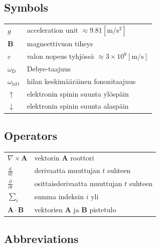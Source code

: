 \documentclass[english,12pt,a4paper,pdftex,elec,utf8]{aaltothesis}
\begin{document}


\subsection*{Symbols}

\begin{tabular}{ll}
$g$          & acceleration unit $ \approx 9.81 \mathrm{[m/s^2]}$\\
$\mathbf{B}$  & magneettivuon tiheys  \\
$c$              & valon nopeus tyhjössä $\approx 3\times10^8 \mathrm{ [m/s]}$\\
$\omega_{\mathrm{D}}$    & Debye-taajuus \\
$\omega_{\mathrm{latt}}$ & hilan keskimääräinen fononitaajuus \\
$\uparrow$       & elektronin spinin suunta ylöspäin\\
$\downarrow$     & elektronin spinin suunta alaspäin
\end{tabular}

\subsection*{Operators}

\begin{tabular}{ll}
$\nabla \times \mathbf{A}$              & vektorin $\mathbf{A}$ roottori\\
$\displaystyle\frac{\mbox{d}}{\mbox{d} t}$ & derivaatta muuttujan $t$ suhteen\\
[3mm]
$\displaystyle\frac{\partial}{\partial t}$  & osittaisderivaatta muuttujan $t$ suhteen \\[3mm]
$\sum_i $                       & summa indeksin $i$ yli\\
$\mathbf{A} \cdot \mathbf{B}$    & vektorien $\mathbf{A}$ ja $\mathbf{B}$ pistetulo
\end{tabular}

\subsection*{Abbreviations}
\end{document}
